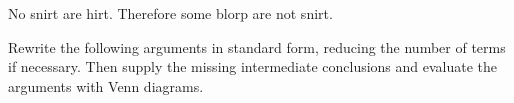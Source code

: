 \begin{exercises}


\item No snirt are hirt. Therefore some blorp are not snirt.

\end{exercises}

\practiceproblems

\noindent\problempart \label{venn_set1} Rewrite the following arguments in standard form, reducing the number of terms if necessary. Then supply the missing intermediate conclusions and evaluate the arguments with Venn diagrams.

